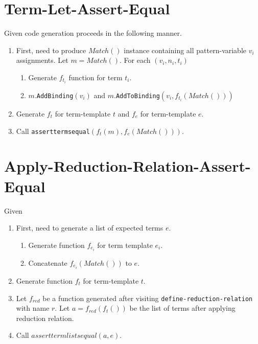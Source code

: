 \section{Term-Let-Assert-Equal}

Given \TermLetAssertEqual code generation proceeds in the following manner.

\begin{enumerate}
\item First, need to produce $Match()$ instance containing all pattern-variable $v_i$ assignments. Let $m=Match()$. For each $(v_i, n_i, t_i)$
	\begin{enumerate}
	\item Generate $f_{t_i}$ function for term $t_i$.
	\item $m$.\texttt{AddBinding}$(v_i)$ and $m$.\texttt{AddToBinding}$(v_i, f_{t_i}(Match()))$
	\end{enumerate}
\item Generate $f_t$ for term-template $t$ and $f_e$ for term-template $e$.
\item Call \texttt{asserttermsequal}$(f_t(m), f_e(Match()))$.
\end{enumerate}


\section{Apply-Reduction-Relation-Assert-Equal}

Given \ApplyReductionRelationAssertEqual
\begin{enumerate}
\item First, need to generate a list of expected terms $e$.
	\begin{enumerate}
	\item Generate function $f_{e_i}$ for term template $e_i$.
	\item Concatenate $f_{e_i}(Match())$ to $e$.
	\end{enumerate}
\item Generate function $f_t$ for term-template $t$.
\item Let $f_{red}$ be a function generated after visiting \texttt{define-reduction-relation} with name $r$. Let $a=f_{red}(f_t())$ be the list of terms after applying reduction relation.
\item Call $asserttermlistsequal(a, e)$.
\end{enumerate}
